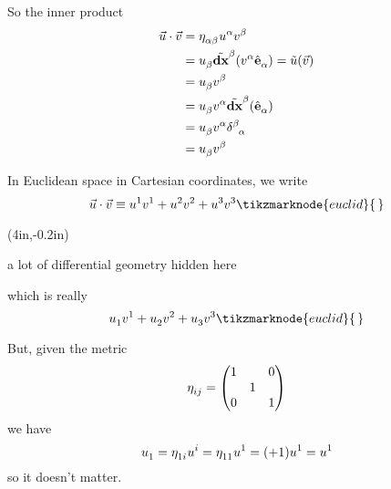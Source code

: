 \documentclass{article}
\begin{document}

\noindent So the inner product
\begin{align*}
	\vec{u} \cdot \vec{v} &= \tensor{\eta}{_\alpha_\beta} \tensor{u}{^\alpha} \tensor{v}{^\beta} \\
	&= \tensor{u}{_\beta} \tensor{\tilde{\mathbf{dx}}}{^\beta} ( \tensor{v}{^\alpha} \tensor{\hat{\mathbf{e}}}{_\alpha} ) = \tilde{u} ( \vec{v} ) \\
	&= \tensor{u}{_\beta} \tensor{v}{^\beta} \\
	&= \tensor{u}{_\beta} \tensor{v}{^\alpha} \tensor{\tilde{\mathbf{dx}}}{^\beta} ( \tensor{\hat{\mathbf{e}}}{_\alpha} ) \\
	&= \tensor{u}{_\beta} \tensor{v}{^\alpha} \tensor{\delta}{^\beta_\alpha} \\
	&= \tensor{u}{_\beta} \tensor{v}{^\beta}
\end{align*}

\noindent In Euclidean space in Cartesian coordinates, we write
\begin{equation*}
	\vec{u} \cdot \vec{v} \equiv \tensor{u}{^1} \tensor{v}{^1} + \tensor{u}{^2} \tensor{v}{^2} + \tensor{u}{^3} \tensor{v}{^3} \tikzmarknode{euclid}{\,}
\end{equation*}
{%
\begin{textblock*}{1.7in}(4in,-0.2in)%
\begin{minipage}[h!]{1.7in}
     a lot of differential geometry hidden here
\end{minipage}%
\end{textblock*}%
}
which is really
\begin{equation*}
	\tensor{u}{_1} \tensor{v}{^1} + \tensor{u}{_2} \tensor{v}{^2} + \tensor{u}{_3} \tensor{v}{^3} \tikzmarknode{euclid}{\,}
\end{equation*}

\noindent But, given the metric
\begin{equation*}
	\tensor{\eta}{_i_j} = %
	\begin{pmatrix}
		1 &   & 0 \\
		  & 1 &   \\
		0 &   & 1
	\end{pmatrix}
\end{equation*}
we have
\begin{equation*}
	\tensor{u}{_1} = \tensor{\eta}{_1_i} \tensor{u}{^i} = \tensor{\eta}{_1_1} \tensor{u}{^1} = (+1) \tensor{u}{^1} = \tensor{u}{^1}
\end{equation*}
so it doesn't matter.
\end{document}
